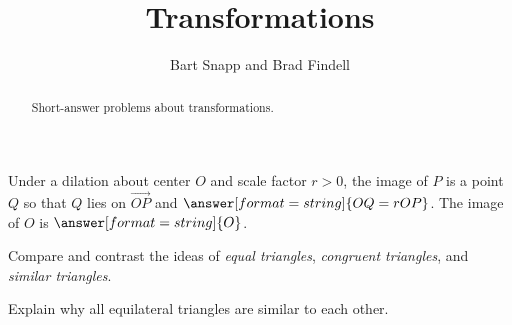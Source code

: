 \documentclass[nooutcomes]{ximera}
\title{Transformations}
\author{Bart Snapp and Brad Findell}
\begin{document}
\begin{abstract}
Short-answer problems about transformations. 
\end{abstract}
\maketitle




%
%
%
%

\begin{question}
Under a dilation about center $O$ and scale factor $r>0$, the image of $P$ is 
a point $Q$ so that $Q$ lies on $\overrightarrow{OP}$ and $\answer[format=string]{OQ=rOP}$.  The image of $O$ is $\answer[format=string]{O}$. 
\end{question}


\begin{question}
Compare and contrast the ideas of \textit{equal triangles},
  \textit{congruent triangles}, and \textit{similar triangles}.
\begin{freeResponse}
\begin{hint}
\end{hint}
\end{freeResponse}
\end{question}

\begin{question}
Explain why all equilateral triangles are similar to each other.
\begin{freeResponse}
\begin{hint}
\end{hint}
\end{freeResponse}
\end{question}
\end{document}
